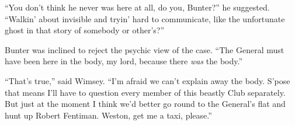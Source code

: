 \enquote{You don't think he never was here at all, do you, Bunter?} he suggested. \enquote{Walkin' about invisible and tryin' hard to communicate, like the unfortunate ghost in that story of somebody or other's?}

Bunter was inclined to reject the psychic view of the case. \enquote{The General must have been here in the body, my lord, because there \textit{was} the body.}

\enquote{That's true,} said Wimsey. \enquote{I'm afraid we can't explain away the body. S'pose that means I'll have to question every member of this beastly Club separately. But just at the moment I think we'd better go round to the General's flat and hunt up Robert Fentiman. Weston, get me a taxi, please.}
